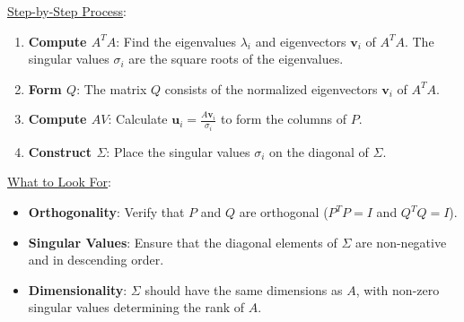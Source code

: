 \documentclass[8pt, a4paper, landscape]{extarticle} %
\begin{document}
\begin{multicols*}{4}
  \underline{Step-by-Step Process}:
  \begin{enumerate}
    \item \textbf{Compute \( A^T A \)}: Find the eigenvalues \(\lambda_i\) and eigenvectors \( \mathbf{v}_i \) of \( A^T A \). The singular values \(\sigma_i\) are the square roots of the eigenvalues.
    \item \textbf{Form \( Q \)}: The matrix \( Q \) consists of the normalized eigenvectors \( \mathbf{v}_i \) of \( A^T A \).
    \item \textbf{Compute \( AV \)}: Calculate \( \mathbf{u}_i = \frac{A \mathbf{v}_i}{\sigma_i} \) to form the columns of \( P \).
    \item \textbf{Construct \( \Sigma \)}: Place the singular values \(\sigma_i\) on the diagonal of \( \Sigma \).
  \end{enumerate}

  \underline{What to Look For}:
  \begin{itemize}
    \item \textbf{Orthogonality}: Verify that \( P \) and \( Q \) are orthogonal (\( P^T P = I \) and \( Q^T Q = I \)).
    \item \textbf{Singular Values}: Ensure that the diagonal elements of \( \Sigma \) are non-negative and in descending order.
    \item \textbf{Dimensionality}: \( \Sigma \) should have the same dimensions as \( A \), with non-zero singular values determining the rank of \( A \).
  \end{itemize}



\end{multicols*}
\end{document}
